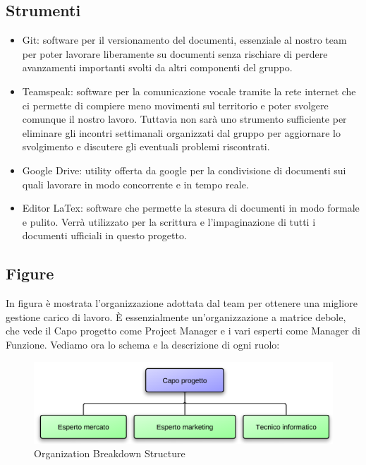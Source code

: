 \subsection{Strumenti}
\begin{itemize}
\item Git: software per il versionamento del documenti, essenziale al nostro team per poter lavorare liberamente su documenti senza rischiare di perdere avanzamenti importanti svolti da altri componenti del gruppo.
\item Teamspeak: software per la comunicazione vocale tramite la rete internet che ci permette di compiere meno movimenti sul territorio e poter svolgere comunque il nostro lavoro. Tuttavia non sarà uno strumento sufficiente per eliminare gli incontri settimanali organizzati dal gruppo per aggiornare lo svolgimento e discutere gli eventuali problemi riscontrati.
\item Google Drive: utility offerta da google per la condivisione di documenti sui quali lavorare in modo concorrente e in tempo reale.
\item Editor LaTex: software che permette la stesura di documenti in modo formale e pulito. Verrà utilizzato per la scrittura e l'impaginazione di tutti i documenti ufficiali in questo progetto.
\end{itemize}

\subsection{Figure}
In figura  è mostrata l'organizzazione adottata dal team per ottenere una migliore gestione carico di lavoro. È essenzialmente un'organizzazione a matrice debole, che vede il Capo progetto come Project Manager e i vari esperti come Manager di Funzione. Vediamo ora lo schema e la descrizione di ogni ruolo:

\vspace*{0.5cm}

\begin{figure}[H]
\centering
\includegraphics[scale=1]{images/cap3/obs.png}
\caption{Organization Breakdown Structure}
\end{figure}

